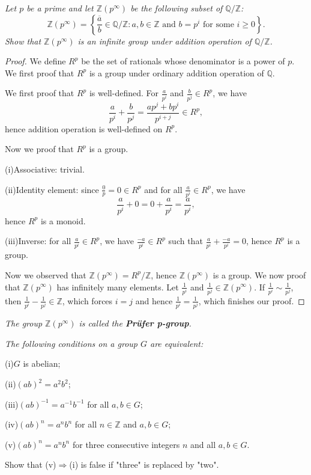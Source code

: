 \begin{problem}\em
Let $p$ be a prime and let $\mathbb{Z}(p^\infty)$ be the following subset of $\mathbb{Q}/\mathbb{Z}$:
$$
\mathbb{Z} \left( p^{\infty} \right) =\left\{ \overline{\frac{a}{b}}\in \mathbb{Q} /\mathbb{Z} :a,b\in \mathbb{Z} \,\,\mathrm{and}\,\, b=p^i\,\,\mathrm{for} \,\,\mathrm{some}\,\, i\ge 0 \right\} .
$$
Show that $\mathbb{Z}(p^\infty)$ is an infinite group under addition operation of $\mathbb{Q}/\mathbb{Z}$.
\end{problem}
\begin{proof}
We define $R^p$ be the set of rationals whose denominator is a power of $p$. We first proof that $R^p$ is a group under ordinary addition operation of $\mathbb{Q}$.\par
We first proof that $R^p$ is well-defined. For $\frac{a}{p^i}$ and $\frac{b}{p^j}\in R^p$, we have 
$$
\frac{a}{p^i}+\frac{b}{p^j}=\frac{ap^j+bp^i}{p^{i+j}}\in R^p,
$$
hence addition operation is well-defined on $R^p$.\par
Now we proof that $R^p$ is a group.\par
(i)Associative: trivial.\par
(ii)Identity element: since $\frac{0}{p}=0\in R^p$ and for all $\frac{a}{p^i}\in R^p$, we have 
$$\frac{a}{p^i}+0=0+\frac{a}{p^i}=\frac{a}{p^i},$$
hence $R^p$ is a monoid.\par
(iii)Inverse: for all $\frac{a}{p^i}\in R^p$, we have $\frac{-a}{p^i}\in R^p$ such that $\frac{a}{p^i}+\frac{-a}{p^i}=0$, hence $R^p$ is a group.\par
Now we observed that $\mathbb{Z}(p^\infty)=R^p/\mathbb{Z}$, hence $\mathbb{Z}(p^\infty)$ is a group. We now proof that $\mathbb{Z}(p^\infty)$ has infinitely many elements. Let $\frac{1}{p^i}$ and $\frac{1}{p^j}\in\mathbb{Z}(p^\infty)$. If $\frac{1}{p^i}\sim\frac{1}{p^j}$, then $\frac{1}{p^i}-\frac{1}{p^j}\in\mathbb{Z}$, which forces $i=j$ and hence $\frac{1}{p^i}=\frac{1}{p^j}$, which finishes our proof.
\end{proof}
\begin{note}\em
The group $\mathbb{Z}(p^\infty)$ is called the \textbf{Prüfer p-group}.
\end{note}
\begin{problem}\em
The following conditions on a group $G$ are equivalent:\par
(i)$G$ is abelian;\par
(ii)$(ab)^2=a^2b^2$;\par
(iii)$(ab)^{-1}=a^{-1}b^{-1}$ for all $a,b\in G$;\par
(iv)$(ab)^n=a^nb^n$ for all $n\in\mathbb{Z}$ and $a,b\in G$;\par
(v)$(ab)^n=a^nb^n$ for three consecutive integers $n$ and all $a,b\in G$.\par
Show that (v)$\Rightarrow$(i) is false if "three" is replaced by "two".
\end{problem}
